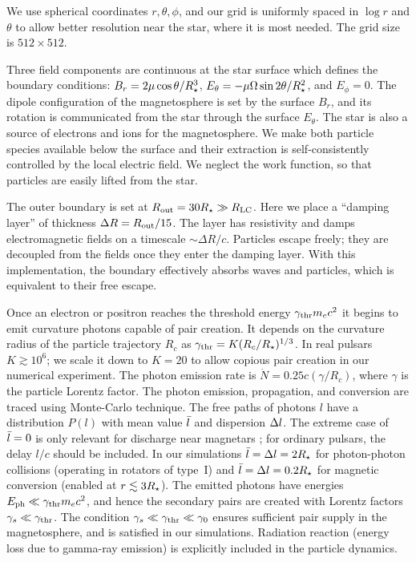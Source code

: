 We use spherical coordinates $r,\theta,\phi$, and our grid is uniformly spaced
in $\log r$ and $\theta$ to allow better resolution near the star, where it is most
needed. The grid size is $512\times 512$.

Three field components are continuous at the star surface which defines
the boundary conditions: $B_r=2\mu\cos\theta/R_{\star}^3$, $E_{\theta} =
-\mu\Omega\sin 2\theta/R_{\star}^2$, and $E_\phi=0$.
The dipole configuration of the magnetosphere is set by the surface $B_r$, and
its rotation is communicated from the star through the surface $E_\theta$.
The star is also a source of electrons and ions for the magnetosphere.
We make both particle species available below the surface and their extraction
is self-consistently controlled by the local electric field.  We neglect the work function,
so that particles are easily lifted from the star.

The outer boundary is set at $R_{\rm out}=30R_{\star}\gg R_\mathrm{LC}$.
Here we place a ``damping layer'' of thickness $\Delta R=R_{\rm out}/15$.
The layer has resistivity and damps electromagnetic fields on
a timescale $\sim\Delta R/c$.  Particles escape freely; they
are decoupled from the fields once they enter the damping layer.  With
this implementation, the boundary effectively absorbs waves and
particles, which is equivalent to their free escape.

Once an electron or positron reaches the threshold energy $\gamma_{\rm thr}
m_ec^2$ it begins to emit curvature photons capable of pair creation.
It depends on the curvature radius of the particle trajectory $R_c$ as
$\gamma_{\rm thr}= K (R_c/R_{\star})^{1/3}$. In real pulsars $K\gtrsim 10^6$; we scale
it down to $K=20$ to allow copious pair creation in our numerical
experiment.
The photon emission rate is $\dot{N}=0.25 c(\gamma/R_c)$,
where $\gamma$ is the particle Lorentz factor.
The photon emission, propagation, and conversion are
traced using Monte-Carlo technique.  The free paths of photons $l$
have a distribution $P(l)$ with mean value
$\bar{l}$ and dispersion $\Delta l$. The extreme case of $\bar{l}=0$ is only relevant for
discharge near magnetars \citep{beloborodov_corona_2007};
for ordinary pulsars, the delay $l/c$ should be included. In our simulations
$\bar{l}=\Delta l=2R_{\star}$ for photon-photon collisions
(operating in rotators of type~I)
and $\bar{l}=\Delta l=0.2R_{\star}$ for magnetic conversion (enabled at $r\lesssim 3R_{\star}$).
The emitted photons have energies $E_{\rm ph}\ll \gamma_{\rm thr} m_ec^2$, and hence
the secondary pairs are created with Lorentz factors $\gamma_s\ll\gamma_{\rm thr}$.
The condition $\gamma_s\ll \gamma_{\rm thr}\ll\gamma_0$ ensures sufficient pair supply in the
magnetosphere, and is satisfied in our simulations.
Radiation reaction (energy loss due to gamma-ray emission) is
explicitly included in the particle dynamics.

